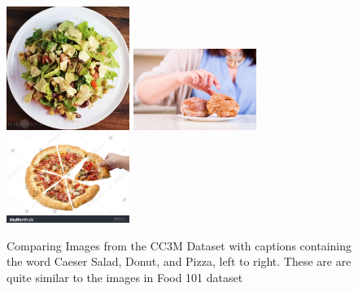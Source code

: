 \documentclass{article} %
\theoremstyle{plain}
\theoremstyle{definition}
\theoremstyle{remark}
\begin{document}
\begin{figure}[!h]
    \centering\includegraphics[width=4cm]{caeser.png} \hfill
    \includegraphics[width=4cm]{donuts.png} \hfill
    \includegraphics[width=4cm]{pizza.png}
    \caption{Comparing Images from the CC3M Dataset with captions containing the word Caeser Salad, Donut, and Pizza, left to right. These are are quite similar to the images in Food 101 dataset}
    \label{food}
\end{figure}

\label{clipn}
\end{document}
